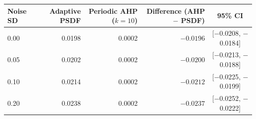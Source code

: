 \begin{tabular}{lrrrc}
\toprule
Noise SD & Adaptive PSDF & Periodic AHP ($k=10$) & Difference (AHP $-$ PSDF) & 95\% CI \\
\midrule
0.00 & 0.0198 & 0.0002 & $-0.0196$ & [$-$0.0208, $-$0.0184] \\
0.05 & 0.0202 & 0.0002 & $-0.0200$ & [$-$0.0213, $-$0.0188] \\
0.10 & 0.0214 & 0.0002 & $-0.0212$ & [$-$0.0225, $-$0.0199] \\
0.20 & 0.0238 & 0.0002 & $-0.0237$ & [$-$0.0252, $-$0.0222] \\
\bottomrule
\end{tabular}
